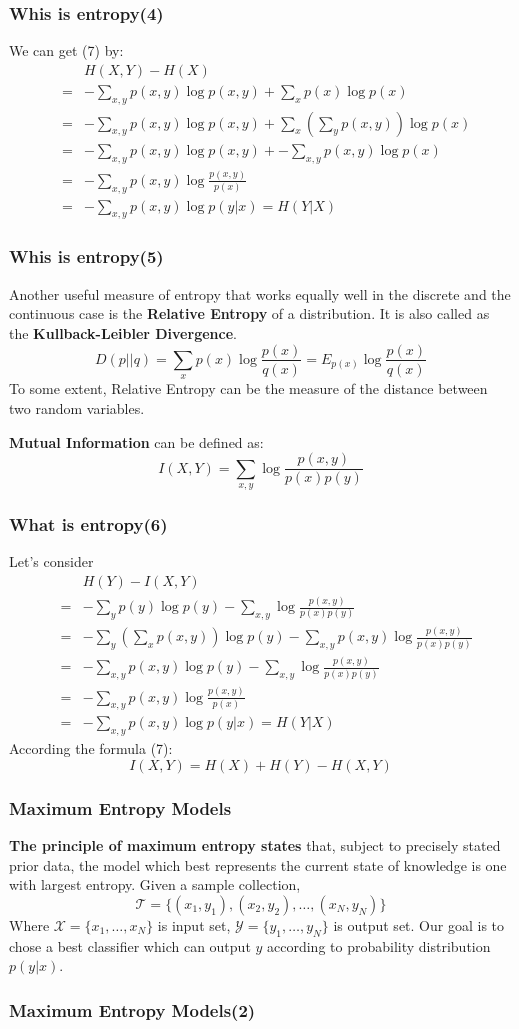 \documentclass[slidestop,compress,mathserif]{beamer}
\begin{document}
	\begin{frame}[shrink]	
		\frametitle{Whis is entropy(4)}
		We can get (7) by:
		\begin{eqnarray*}
			&& H(X,Y)-H(X) \\
			&=& -\sum_{x,y}p(x,y)\log p(x,y) + \sum_x p(x)\log p(x)\\
			&=& -\sum_{x,y}p(x,y)\log p(x,y) + \sum_x\left(\sum_y p(x,y)\right)\log p(x)\\
			&=& -\sum_{x,y}p(x,y)\log p(x,y)+ -\sum_{x,y}p(x,y)\log p(x)\\
			&=& -\sum_{x,y}p(x,y)\log\frac{p(x,y)}{p(x)}\\
			&=& -\sum_{x,y} p(x,y)\log p(y|x) = H(Y|X)
		\end{eqnarray*}

	\end{frame}
	
	\begin{frame}
		\frametitle{Whis is entropy(5)}
		Another useful measure of entropy that works equally well in the discrete and the continuous case is the \textbf{Relative Entropy} of a distribution. It is also called as the \textbf{Kullback-Leibler Divergence}.
		$$D(p||q) = \sum_x p(x)\log \frac{p(x)}{q(x)} = E_{p(x)}\log\frac{p(x)}{q(x)}$$
		To some extent, Relative Entropy can be the measure of the distance between two random variables.
		
		\textbf{Mutual Information} can be defined as:
		$$I(X,Y)=\sum_{x,y}\log\frac{p(x,y)}{p(x)p(y)}$$
	\end{frame}
	
	\begin{frame}[shrink]
		\frametitle{What is entropy(6)}
		Let's consider
		\begin{eqnarray*}
			&& H(Y)-I(X,Y)  \\
			&=& -\sum_y p(y)\log p(y) - \sum_{x,y}\log\frac{p(x,y)}{p(x)p(y)} \\
			&=& -\sum_y\left(\sum_x p(x,y)\right)\log p(y) - \sum_{x,y}p(x,y)\log\frac{p(x,y)}{p(x)p(y)} \\
			&=& -\sum_{x,y}p(x,y)\log p(y) - \sum_{x,y}\log\frac{p(x,y)}{p(x)p(y)} \\
			&=& -\sum_{x,y}p(x,y)\log\frac{p(x,y)}{p(x)} \\
			&=& -\sum_{x,y}p(x,y)\log p(y|x) = H(Y|X)
		\end{eqnarray*}
		According the formula (7):
		$$I(X,Y) = H(X)+H(Y)-H(X,Y)$$
	\end{frame}
	
	\begin{frame}
		\frametitle{Maximum Entropy Models}
		\textbf{The principle of maximum entropy states} that, subject to precisely stated prior data, the model which best represents the current state of knowledge is one with largest entropy.
		Given a sample collection, $$\mathcal{T}=\{(x_1,y_1),(x_2,y_2),\ldots,(x_N,y_N)\}$$
		Where $\mathcal{X}=\{x_1,\ldots,x_N\}$ is input set, $\mathcal{Y}=\{y_1,\ldots,y_N\}$ is output set. Our goal is to chose a best classifier which can output $y$ according to probability distribution $p(y|x)$.
		
	\end{frame}
	
	\begin{frame}
		\frametitle{Maximum Entropy Models(2)}
		
	\end{frame}
\end{document}
